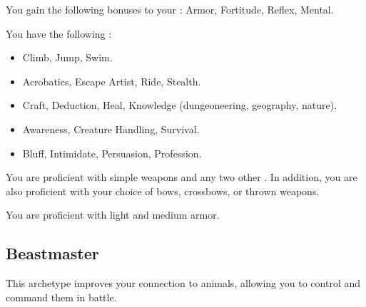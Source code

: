         You gain the following bonuses to your :  Armor,  Fortitude,  Reflex,  Mental.

        You have the following :
        \begin{itemize}
            \item {} Climb, Jump, Swim.
            \item {} Acrobatics, Escape Artist, Ride, Stealth.
            \item {} Craft, Deduction, Heal, Knowledge (dungeoneering, geography, nature).
            \item {} Awareness, Creature Handling, Survival.
            \item {} Bluff, Intimidate, Persuasion, Profession.
        \end{itemize}

        You are proficient with simple weapons and any two other .
        In addition, you are also proficient with your choice of bows, crossbows, or thrown weapons.

        You are proficient with light and medium armor.

    \subsection{Beastmaster}
        This archetype improves your connection to animals, allowing you to control and command them in battle.

